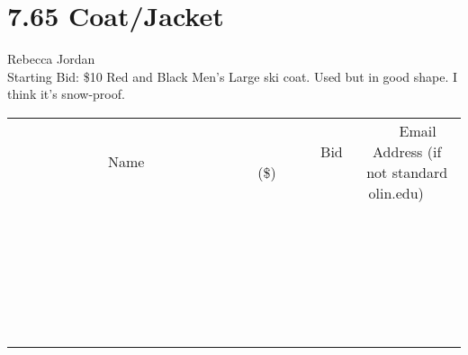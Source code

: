 \documentclass[11pt]{article}
\begin{document}
\section*{7.65 Coat/Jacket}
Rebecca Jordan
\\
Starting Bid: \$10
\newline
Red and Black Men's Large ski coat. Used but in good shape. I think it's snow-proof.
\\[6ex]
\begin{tabular}{c c c}
~~~~~~~~~~~~~Name~~~~~~~~~~~~~ & ~~~~~~~~~Bid (\$)~~~~~~~~~  & ~~~Email Address (if not standard olin.edu)~~~\\
 & & \\
\hline
 & & \\
\hline
 & & \\
\hline
 & & \\
\hline
 & & \\
\hline
 & & \\
\hline
 & & \\
\hline
 & & \\
\hline
 & & \\
\hline
 & & \\
\hline
 & & \\
\hline
 & & \\
\hline
 & & \\
\hline
 & & \\
\hline
 & & \\
\hline
 & & \\
\hline
 & & \\
\hline
 & & \\
\hline
 & & \\
\hline
 & & \\
\hline
 & & \\
\hline
 & & \\
\hline
 & & \\
\hline
 & & \\
\hline
 & & \\
\hline
 & & \\
\hline
\end{tabular}
\newpage
\end{document}
